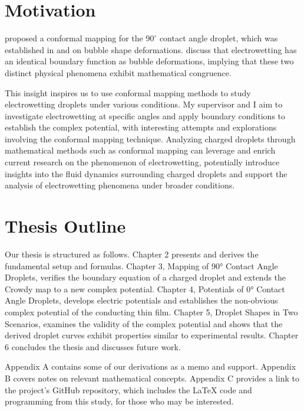\section{Motivation}
\hspace{0em}\indent \citet{crowdy2015} proposed a conformal mapping for the $90^\circ$ contact angle droplet, which was established in \citet{Crowdy1999} and \citet{Crowdy2000} on bubble shape deformations. \citeauthor{Crowdy2015} discuss that electrowetting has an identical boundary function as bubble deformations, implying that these two distinct physical phenomena exhibit mathematical congruence.


This insight inspires us to use conformal mapping methods to study electrowetting droplets under various conditions. My supervisor and I aim to investigate electrowetting at specific angles and apply boundary conditions to establish the complex potential, with interesting attempts and explorations involving the conformal mapping technique. Analyzing charged droplets through mathematical methods such as conformal mapping can leverage and enrich current research on the phenomenon of electrowetting, potentially introduce insights into the fluid dynamics surrounding charged droplets and support the analysis of electrowetting phenomena under broader conditions.

\section{Thesis Outline}
Our thesis is structured as follows. Chapter 2 presents and derives the fundamental setup and formulas. Chapter 3, Mapping of 90° Contact Angle Droplets, verifies the boundary equation of a charged droplet and extends the Crowdy map to a new complex potential. Chapter 4, Potentials of 0° Contact Angle Droplets, develops electric potentials and establishes the non-obvious complex potential of the conducting thin film. Chapter 5, Droplet Shapes in Two Scenarios, examines the validity of the complex potential and shows that the derived droplet curves exhibit properties similar to experimental results. Chapter 6 concludes the thesis and discusses future work.

Appendix A contains some of our derivations as a memo and support. Appendix B covers notes on relevant mathematical concepts. Appendix C provides a link to the project's GitHub repository, which includes the LaTeX code and programming from this study, for those who may be interested.

